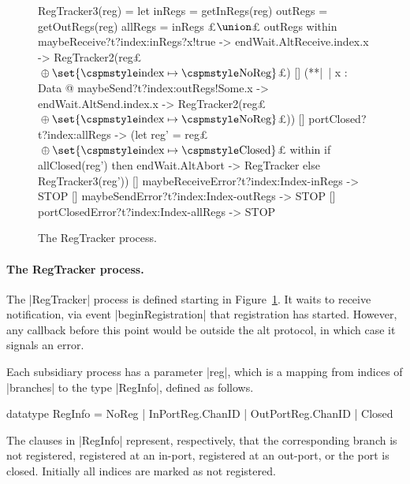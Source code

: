 \begin{figure}
\begin{cspm}
RegTracker3(reg) = 
  let inRegs = getInRegs(reg) 
      outRegs = getOutRegs(reg)
      allRegs = inRegs £$\union$£ outRegs within
  maybeReceive?t?index:inRegs?x!true -> endWait.AltReceive.index.x -> 
     RegTracker2(reg£%
    $\null\oplus \set{\CSPMMR{index} \mapsto \CSPMMR{NoReg}}$£)
  [] (**|~| x : Data @ maybeSend?t?index:outRegs!Some.x -> endWait.AltSend.index.x -> 
        RegTracker2(reg£$\null\oplus \set{\CSPMMR{index} \mapsto \CSPMMR{NoReg}}$£))
  [] portClosed?t?index:allRegs -> 
        (let reg' = reg£%
      $\null\oplus \set{\CSPMMR{index} \mapsto \CSPMMR{Closed}}$£ within
         if allClosed(reg') then endWait.AltAbort -> RegTracker else RegTracker3(reg'))
  [] maybeReceiveError?t?index:Index-inRegs -> STOP
  [] maybeSendError?t?index:Index-outRegs -> STOP
  [] portClosedError?t?index:Index-allRegs -> STOP
\end{cspm}
\caption{The {\scalastyle RegTracker} process. 
\label{fig:RegTracker}}
\end{figure}




\paragraph{The {\scalashape RegTracker} process.}

The |RegTracker| process is defined starting in Figure~\ref{fig:RegTracker}.
It waits to receive notification, via event |beginRegistration| that
registration has started.  However, any callback before this point would be
outside the alt protocol, in which case it signals an error.

Each subsidiary process has a parameter |reg|, which is a mapping from
indices of |branches| to the type |RegInfo|, defined as follows.
%
\begin{cspm}
  datatype RegInfo = NoReg | InPortReg.ChanID | OutPortReg.ChanID | Closed
\end{cspm}
%
The clauses in |RegInfo| represent, respectively, that the corresponding
branch is not registered, registered at an in-port, registered at an out-port,
or the port is closed.  Initially all indices are marked as not registered.

